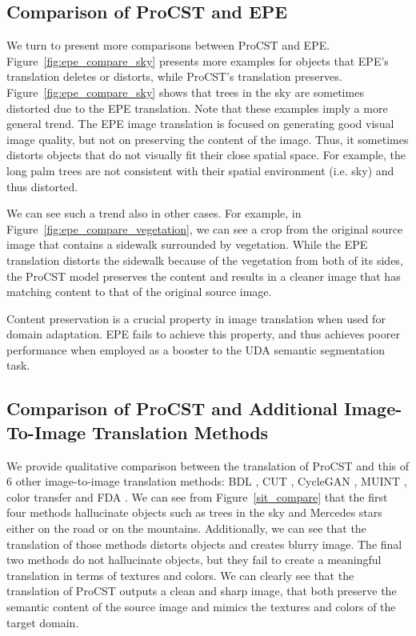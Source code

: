 \documentclass[letterpaper]{article} \usepackage[]{aaai23}  \usepackage{times}  \usepackage{helvet}  \usepackage{courier}  \usepackage[hyphens]{url}  \usepackage{graphicx} \urlstyle{rm} \def\UrlFont{\rm}  \usepackage{natbib}  \usepackage{caption} \frenchspacing  \setlength{\pdfpagewidth}{8.5in} \setlength{\pdfpageheight}{11in} \usepackage{algorithm}
\begin{document}
\subsection{Comparison of ProCST and EPE}
We turn to present more comparisons between ProCST and EPE. Figure~\ref{fig:epe_compare_sky} presents more examples for objects that EPE's translation deletes or distorts, while ProCST's translation preserves. Figure~\ref{fig:epe_compare_sky} shows that trees in the sky are sometimes distorted due to the EPE translation. Note that these examples imply a more general trend. The EPE image translation is focused on generating good visual image quality, but not on preserving the content of the image. Thus, it sometimes distorts objects that do not visually fit their close spatial space. For example, the long palm trees are not consistent with their spatial environment (i.e. sky) and thus distorted. 

We can see such a trend also in other cases. For example, in Figure~\ref{fig:epe_compare_vegetation}, we can see a crop from the original source image that contains a sidewalk surrounded by vegetation. While the EPE translation distorts the sidewalk because of the vegetation from both of its sides, the ProCST model preserves the content and results in a cleaner image that has matching content to that of the original source image.

Content preservation is a crucial property in image translation when used for domain adaptation. EPE fails to achieve this property, and thus achieves poorer performance when employed as a booster to the UDA semantic segmentation task.

\subsection{Comparison of ProCST and Additional Image-To-Image Translation Methods}
We provide qualitative comparison between the translation of ProCST and this of 6 other image-to-image translation methods: BDL \cite{li2019bidirectional}, CUT \cite{park2020contrastive}, CycleGAN \cite{zhu2017unpaired}, MUINT \cite{huang2018munit}, color transfer \cite{reinhard2001color} and FDA \cite{yang2020fda}. We can see from Figure~\ref{sit_compare} that the first four methods hallucinate objects such as trees in the sky and Mercedes stars either on the road or on the mountains. Additionally, we can see that the translation of those methods distorts objects and creates blurry image. The final two methods do not hallucinate objects, but they fail to create a meaningful translation in terms of textures and colors. We can clearly see that the translation of ProCST outputs a clean and sharp image, that both preserve the semantic content of the source image and mimics the textures and colors of the target domain. 
\end{document}
